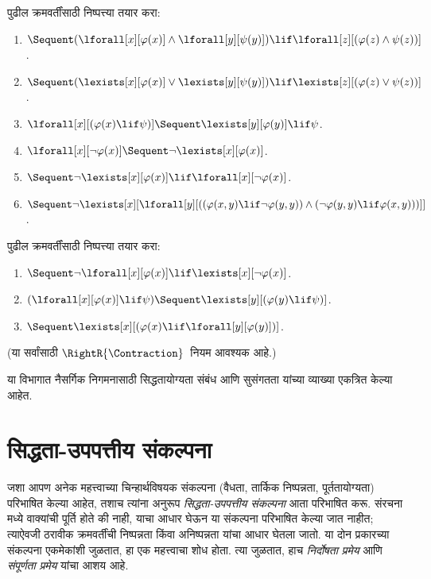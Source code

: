 \begin{prob}
पुढील क्रमवर्तींसाठी निष्पत्त्या तयार करा:
\begin{enumerate}
\item $\Sequent (\lforall[x][\varphi(x)] \land \lforall[y][\psi(y)]) \lif
\lforall[z][(\varphi(z) \land \psi(z))]$.
\item $\Sequent (\lexists[x][\varphi(x)] \lor \lexists[y][\psi(y)]) \lif
\lexists[z][(\varphi(z) \lor \psi(z))]$.
\item $\lforall[x][(\varphi(x) \lif \psi)] \Sequent \lexists[y][\varphi(y)] \lif \psi$.
\item $\lforall[x][\lnot \varphi(x)] \Sequent \lnot\lexists[x][\varphi(x)]$.
\item $\Sequent \lnot\lexists[x][\varphi(x)] \lif \lforall[x][\lnot \varphi(x)]$.
\item $\Sequent \lnot\lexists[x][\lforall[y][((\varphi(x,y) \lif \lnot
\varphi(y,y)) \land (\lnot \varphi(y,y) \lif \varphi(x,y)))]]$.
\end{enumerate}
\end{prob}

\begin{prob}
पुढील क्रमवर्तींसाठी निष्पत्त्या तयार करा:
\begin{enumerate}
\item $\Sequent \lnot\lforall[x][\varphi(x)] \lif \lexists[x][\lnot\varphi(x)]$.
\item $(\lforall[x][\varphi(x)] \lif \psi) \Sequent \lexists[y][(\varphi(y) \lif \psi)]$.
\item $\Sequent \lexists[x][(\varphi(x) \lif \lforall[y][\varphi(y)])]$.
\end{enumerate}
(या सर्वांसाठी $\RightR{\Contraction}$~नियम आवश्यक आहे.)
\end{prob}







\begin{editorial}
  या विभागात नैसर्गिक निगमनासाठी सिद्धतायोग्यता संबंध आणि सुसंगतता यांच्या
  व्याख्या एकत्रित केल्या आहेत.
\end{editorial}



\section{सिद्धता-उपपत्तीय संकल्पना}\label{fol:seq:ptn:sec}

\begin{explain}
जशा आपण अनेक महत्त्वाच्या चिन्हार्थविषयक संकल्पना (वैधता, तार्किक निष्पन्नता,
पूर्ततायोग्यता) परिभाषित केल्या आहेत, तशाच त्यांना अनुरूप
\emph{सिद्धता-उपपत्तीय संकल्पना} आता परिभाषित करू. संरचना मध्ये
वाक्यांची पूर्ति होते की नाही, याचा आधार घेऊन या संकल्पना परिभाषित
केल्या जात नाहीत; त्याऐवजी ठरावीक क्रमवर्तींची निष्पन्नता किंवा
अनिष्पन्नता यांचा आधार घेतला जातो. या दोन प्रकारच्या संकल्पना
एकमेकांशी जुळतात, हा एक महत्त्वाचा शोध होता. त्या जुळतात, हाच
\emph{निर्दोषता प्रमेय} आणि \emph{संपूर्णता प्रमेय} यांचा आशय आहे.
\end{explain}

